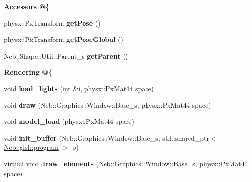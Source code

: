 \begin{Indent}{\bf Accessors @\{}\par
\begin{DoxyCompactItemize}
\item 
\hypertarget{classNeb_1_1Shape_1_1Base_ab3d11b90943d1de0783789dc1318b670}{physx\-::\-Px\-Transform {\bfseries get\-Pose} ()}\label{classNeb_1_1Shape_1_1Base_ab3d11b90943d1de0783789dc1318b670}

\item 
\hypertarget{classNeb_1_1Shape_1_1Base_a4580b58dbab5a9a126c9b73ff253b46d}{physx\-::\-Px\-Transform {\bfseries get\-Pose\-Global} ()}\label{classNeb_1_1Shape_1_1Base_a4580b58dbab5a9a126c9b73ff253b46d}

\item 
\hypertarget{classNeb_1_1Shape_1_1Base_a1553ed6727fc83a4350919f266e84720}{Neb\-::\-Shape\-::\-Util\-::\-Parent\-\_\-s {\bfseries get\-Parent} ()}\label{classNeb_1_1Shape_1_1Base_a1553ed6727fc83a4350919f266e84720}

\end{DoxyCompactItemize}
\end{Indent}
\begin{Indent}{\bf Rendering @\{}\par
\begin{DoxyCompactItemize}
\item 
\hypertarget{classNeb_1_1Shape_1_1Base_a6ead2ae23f4a40c548557d7f4ca0776a}{void {\bfseries load\-\_\-lights} (int \&i, physx\-::\-Px\-Mat44 space)}\label{classNeb_1_1Shape_1_1Base_a6ead2ae23f4a40c548557d7f4ca0776a}

\item 
\hypertarget{classNeb_1_1Shape_1_1Base_a4af3075465d25cfc80e5d482175d36a5}{void {\bfseries draw} (Neb\-::\-Graphics\-::\-Window\-::\-Base\-\_\-s, physx\-::\-Px\-Mat44 space)}\label{classNeb_1_1Shape_1_1Base_a4af3075465d25cfc80e5d482175d36a5}

\item 
\hypertarget{classNeb_1_1Shape_1_1Base_acf1c451755d1c444d561140984215b2e}{void {\bfseries model\-\_\-load} (physx\-::\-Px\-Mat44 space)}\label{classNeb_1_1Shape_1_1Base_acf1c451755d1c444d561140984215b2e}

\item 
\hypertarget{classNeb_1_1Shape_1_1Base_a5447e4b4946dc45eedca9397a317a92c}{void {\bfseries init\-\_\-buffer} (Neb\-::\-Graphics\-::\-Window\-::\-Base\-\_\-s, std\-::shared\-\_\-ptr$<$ \hyperlink{classNeb_1_1glsl_1_1program}{Neb\-::glsl\-::program} $>$ p)}\label{classNeb_1_1Shape_1_1Base_a5447e4b4946dc45eedca9397a317a92c}

\item 
\hypertarget{classNeb_1_1Shape_1_1Base_addb61a557126c2ad80b1852a94b457d1}{virtual void {\bfseries draw\-\_\-elements} (Neb\-::\-Graphics\-::\-Window\-::\-Base\-\_\-s, physx\-::\-Px\-Mat44 space)}\label{classNeb_1_1Shape_1_1Base_addb61a557126c2ad80b1852a94b457d1}

\end{DoxyCompactItemize}
\end{Indent}

